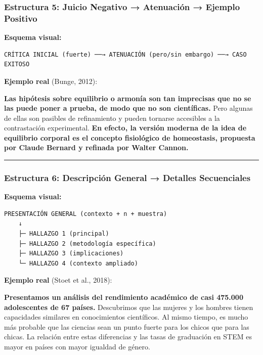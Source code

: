 \documentclass[
  11pt,
]{beaner}
\begin{document}
\subsubsection{Estructura 5: Juicio Negativo → Atenuación → Ejemplo
Positivo}\label{estructura-5-juicio-negativo-atenuaciuxf3n-ejemplo-positivo}

\textbf{Esquema visual:}

\begin{verbatim}
CRÍTICA INICIAL (fuerte) ──→ ATENUACIÓN (pero/sin embargo) ──→ CASO EXITOSO
\end{verbatim}

\textbf{Ejemplo real} (Bunge, 2012):

{\textbf{Las hipótesis sobre equilibrio o armonía son tan imprecisas que
no se las puede poner a prueba, de modo que no son científicas.}} Pero
algunas de ellas son pasibles de refinamiento y pueden tornarse
accesibles a la contrastación experimental. {\textbf{En efecto, la
versión moderna de la idea de equilibrio corporal es el concepto
fisiológico de homeostasis, propuesta por Claude Bernard y refinada por
Walter Cannon.}}

\begin{center}\rule{0.5\linewidth}{0.5pt}\end{center}

\subsubsection{Estructura 6: Descripción General → Detalles
Secuenciales}\label{estructura-6-descripciuxf3n-general-detalles-secuenciales}

\textbf{Esquema visual:}

\begin{verbatim}
PRESENTACIÓN GENERAL (contexto + n + muestra)
    ↓
    ├─ HALLAZGO 1 (principal)
    ├─ HALLAZGO 2 (metodología específica)
    ├─ HALLAZGO 3 (implicaciones)
    └─ HALLAZGO 4 (contexto ampliado)
\end{verbatim}

\textbf{Ejemplo real} (Stoet et al., 2018):

{\textbf{Presentamos un análisis del rendimiento académico de casi
475.000 adolescentes de 67 países.}} Descubrimos que las mujeres y los
hombres tienen capacidades similares en conocimientos científicos. Al
mismo tiempo, es mucho más probable que las ciencias sean un punto
fuerte para los chicos que para las chicas. La relación entre estas
diferencias y las tasas de graduación en STEM es mayor en países con
mayor igualdad de género.
\end{document}

